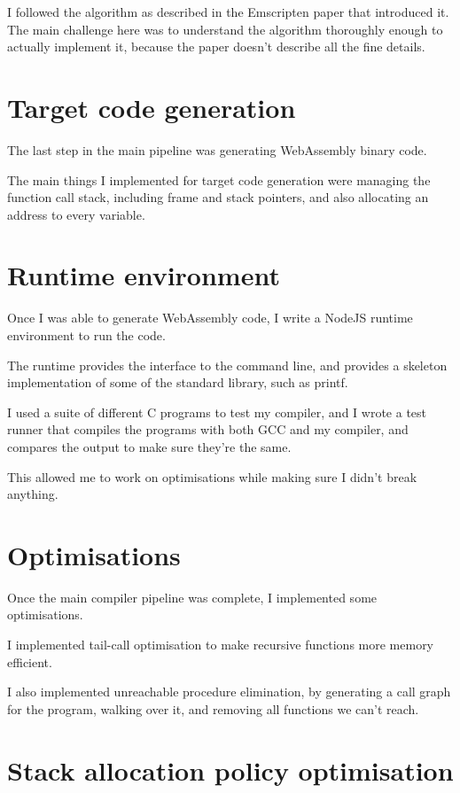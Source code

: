 \documentclass[12pt, a4paper]{article}
\begin{document}
I followed the algorithm as described in the Emscripten paper that introduced it.
The main challenge here was to understand the algorithm thoroughly enough to actually implement it, because the paper doesn't describe all the fine details.


\section*{Target code generation}

The last step in the main pipeline was generating WebAssembly binary code.

The main things I implemented for target code generation were managing the function call stack, including frame and stack pointers, and also allocating an address to every variable.


\section*{Runtime environment}

Once I was able to generate WebAssembly code, I write a NodeJS runtime environment to run the code.

The runtime provides the interface to the command line, and provides a skeleton implementation of some of the standard library, such as printf.

I used a suite of different C programs to test my compiler, and I wrote a test runner that compiles the programs with both GCC and my compiler, and compares the output to make sure they're the same.

This allowed me to work on optimisations while making sure I didn't break anything.


\section*{Optimisations}

Once the main compiler pipeline was complete, I implemented some optimisations.

I implemented tail-call optimisation to make recursive functions more memory efficient.

I also implemented unreachable procedure elimination, by generating a call graph for the program, walking over it, and removing all functions we can't reach.


\section*{Stack allocation policy optimisation}
\end{document}
